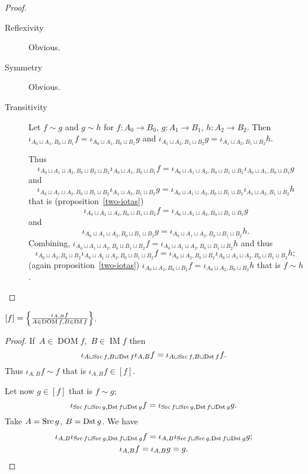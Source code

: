 \begin{proof}
~
\begin{description}
\item[Reflexivity] Obvious.

\item[Symmetry] Obvious.

\item[Transitivity] Let $f\sim g$ and $g\sim h$ for
$f:A_0\to B_0$, $g:A_1\to B_1$, $h:A_2\to B_2$.
Then
$\iota_{A_0\sqcup A_1,B_0\sqcup B_1}f=\iota_{A_0\sqcup A_1,B_0\sqcup B_1}g$ and
$\iota_{A_1\sqcup A_2,B_1\sqcup B_2}g=\iota_{A_1\sqcup A_2,B_1\sqcup B_2}h$.

Thus
\[\iota_{A_0\sqcup A_1\sqcup A_2,B_0\sqcup B_1\sqcup B_2}\iota_{A_0\sqcup A_1,B_0\sqcup B_1}f=\iota_{A_0\sqcup A_1\sqcup A_2,B_0\sqcup B_1\sqcup B_2}\iota_{A_0\sqcup A_1,B_0\sqcup B_1}g\] and
\[\iota_{A_0\sqcup A_1\sqcup A_2,B_0\sqcup B_1\sqcup B_2}\iota_{A_1\sqcup A_2,B_1\sqcup B_2}g=\iota_{A_0\sqcup A_1\sqcup A_2,B_0\sqcup B_1\sqcup B_2}\iota_{A_1\sqcup A_2,B_1\sqcup B_2}h\]
that is (proposition~\ref{two-iotas})
\[\iota_{A_0\sqcup A_1\sqcup A_2,B_0\sqcup B_1\sqcup B_2}f=\iota_{A_0\sqcup A_1\sqcup A_2,B_0\sqcup B_1\sqcup B_2}g\]
and
\[\iota_{A_0\sqcup A_1\sqcup A_2,B_0\sqcup B_1\sqcup B_2}g=\iota_{A_0\sqcup A_1\sqcup A_2,B_0\sqcup B_1\sqcup B_2}h.\]
Combining,
$\iota_{A_0\sqcup A_1\sqcup A_2,B_0\sqcup B_1\sqcup B_2}f=\iota_{A_0\sqcup A_1\sqcup A_2,B_0\sqcup B_1\sqcup B_2}h$ and thus
\[\iota_{A_0\sqcup A_2,B_0\sqcup B_2}\iota_{A_0\sqcup A_1\sqcup A_2,B_0\sqcup B_1\sqcup B_2}f=\iota_{A_0\sqcup A_2,B_0\sqcup B_2}\iota_{A_0\sqcup A_1\sqcup A_2,B_0\sqcup B_1\sqcup B_2}h;\]
(again proposition~\ref{two-iotas}) $\iota_{A_0\sqcup A_2,B_0\sqcup B_2}f=\iota_{A_0\sqcup A_2,B_0\sqcup B_2}h$
that is $f\sim h$.
\end{description}
\end{proof}

\begin{prop}
$[f] = \left\{ \frac{\iota_{A,B}f}{
A\in\operatorname{DOM}f,B\in\operatorname{IM}f}\right\}$.
\end{prop}

\begin{proof}
If~$A\in\operatorname{DOM}f$,~$B\in\operatorname{IM}f$
then
\[\iota_{A\sqcup\operatorname{Src} f,B\sqcup\operatorname{Dst} f}\iota_{A,B}f =
\iota_{A\sqcup\operatorname{Src} f,B\sqcup\operatorname{Dst} f}f.\] Thus
$\iota_{A,B}f\sim f$ that is $\iota_{A,B}f\in[f]$.

Let now $g\in[f]$ that is $f\sim g$;
\[\iota_{\operatorname{Src} f\sqcup\operatorname{Src} g,\operatorname{Dst} f\sqcup\operatorname{Dst} g}f=
\iota_{\operatorname{Src} f\sqcup\operatorname{Src} g,\operatorname{Dst} f\sqcup\operatorname{Dst} g}g.\]
Take $A=\operatorname{Src} g$, $B=\operatorname{Dst} g$. We have
\begin{gather*}
\iota_{A,B}\iota_{\operatorname{Src} f\sqcup\operatorname{Src} g,\operatorname{Dst} f\sqcup\operatorname{Dst} g}f=
\iota_{A,B}\iota_{\operatorname{Src} f\sqcup\operatorname{Src} g,\operatorname{Dst} f\sqcup\operatorname{Dst} g}g;\\
\iota_{A,B}f=\iota_{A,B}g = g.
\end{gather*}
\end{proof}

